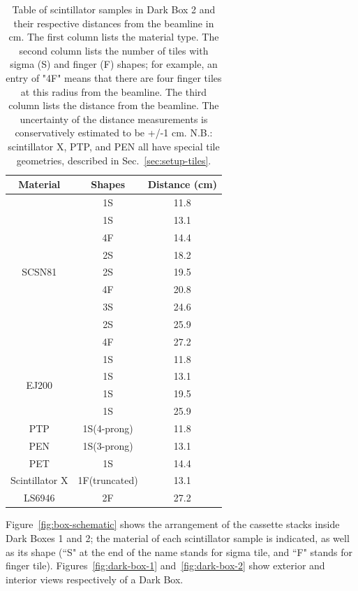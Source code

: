 \begin{table}
\begin{center}
\begin{tabular}{|c|c|c|}
\hline
Material & Shapes & Distance (cm) \\
\hline
\multirow{9}{*}{SCSN81} & 1S & 11.8 \\
& 1S & 13.1 \\
& 4F & 14.4 \\
& 2S & 18.2 \\
& 2S & 19.5 \\
& 4F & 20.8 \\
& 3S & 24.6 \\
& 2S & 25.9 \\
& 4F & 27.2 \\
\hline
\multirow{4}{*}{EJ200} & 1S & 11.8 \\
& 1S & 13.1 \\
& 1S & 19.5 \\
& 1S & 25.9 \\
\hline
PTP & 1S(4-prong) & 11.8 \\
\hline
PEN & 1S(3-prong) & 13.1 \\
\hline
PET & 1S & 14.4 \\
\hline
Scintillator X & 1F(truncated) & 13.1 \\
\hline
LS6946 & 2F & 27.2 \\
\hline
\end{tabular}
\caption{Table of scintillator samples in Dark Box 2 and their respective distances from the beamline in cm. The first column lists the material type. The second column lists the number of tiles with sigma (S) and finger (F) shapes; for example, an entry of "4F" means that there are four finger tiles at this radius from the beamline. The third column lists the distance from the beamline. The uncertainty of the distance measurements is conservatively estimated to be +/-1 cm. N.B.: scintillator X, PTP, and PEN all have special tile geometries, described in Sec.~\ref{sec:setup-tiles}.}
\label{tab:distances-box2}
\end{center}
\end{table}

Figure~\ref{fig:box-schematic} shows the arrangement of the cassette stacks inside Dark Boxes 1 and 2; the material of each scintillator sample is indicated, as well as its shape (``S" at the end of the name stands for sigma tile, and ``F" stands for finger tile). Figures~\ref{fig:dark-box-1} and~\ref{fig:dark-box-2} show exterior and interior views respectively of a Dark Box.

